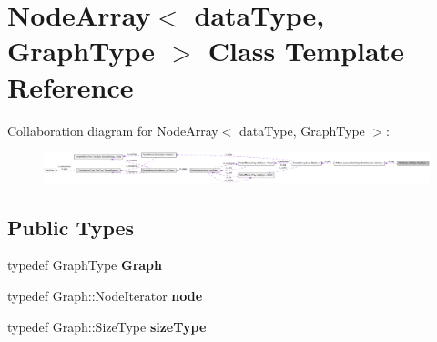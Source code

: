 \hypertarget{class_node_array}{
\section{NodeArray$<$ dataType, GraphType $>$ Class Template Reference}
\label{class_node_array}
}


Collaboration diagram for NodeArray$<$ dataType, GraphType $>$:\nopagebreak
\begin{figure}[H]
\begin{center}
\leavevmode
\includegraphics[width=400pt]{class_node_array__coll__graph}
\end{center}
\end{figure}
\subsection*{Public Types}
\begin{DoxyCompactItemize}
\item 
\hypertarget{class_node_array_ab8e38c654d39e7c5a323db7a5b696610}{
typedef GraphType {\bfseries Graph}}
\label{class_node_array_ab8e38c654d39e7c5a323db7a5b696610}

\item 
\hypertarget{class_node_array_a18ed5a42164e3d0cc969a0bfe2b1bcfb}{
typedef Graph::NodeIterator {\bfseries node}}
\label{class_node_array_a18ed5a42164e3d0cc969a0bfe2b1bcfb}

\item 
\hypertarget{class_node_array_ad27f0e7e552bc2d6d1a059e6b679f7d5}{
typedef Graph::SizeType {\bfseries sizeType}}
\label{class_node_array_ad27f0e7e552bc2d6d1a059e6b679f7d5}

\end{DoxyCompactItemize}
